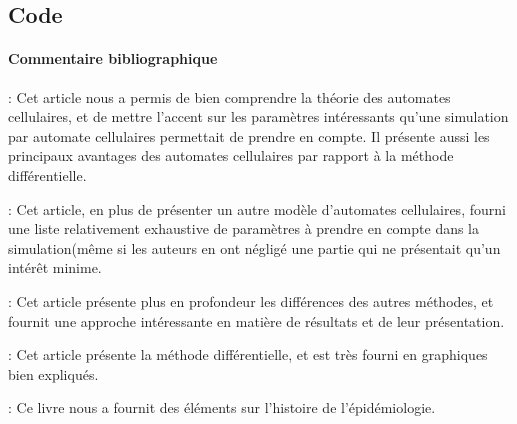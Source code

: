 \documentclass{article}
\begin{document}
	\subsection{Code}

\lstset{breaklines=true}







\newpage

\paragraph{Commentaire bibliographique\\}
\noindent
\cite{ref1} : Cet article nous a permis de bien comprendre la théorie des automates cellulaires, et de mettre l'accent sur les paramètres intéressants qu'une simulation par automate cellulaires permettait de prendre en compte. Il présente aussi les principaux avantages des automates cellulaires par rapport à la méthode différentielle.

\cite{ref2} : Cet article, en plus de présenter un autre modèle d'automates cellulaires, fourni une liste relativement exhaustive de paramètres à prendre en compte dans la simulation(même si les auteurs en ont négligé une partie qui ne présentait qu'un  intérêt minime.

\cite{ref3} : Cet article présente plus en profondeur les différences des autres méthodes,  et fournit une approche intéressante en matière de résultats et de leur présentation.

\cite{ref4} : Cet article présente la méthode différentielle, et est très fourni en graphiques bien expliqués.

\cite{ref5} : Ce livre nous a fournit des éléments sur l'histoire de l'épidémiologie.




\end{document}

